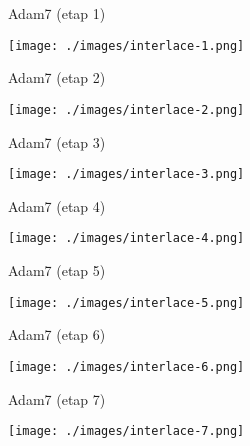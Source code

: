 \documentclass[presentation]{beamer}
\begin{document}
\begin{frame}[label={sec:orgb33b59d}]{Adam7 (etap 1)}
\begin{center}
\texttt{[image: ./images/interlace-1.png]}
\end{center}
\end{frame}

\begin{frame}[label={sec:org6484f97}]{Adam7 (etap 2)}
\begin{center}
\texttt{[image: ./images/interlace-2.png]}
\end{center}
\end{frame}

\begin{frame}[label={sec:org1b7b550}]{Adam7 (etap 3)}
\begin{center}
\texttt{[image: ./images/interlace-3.png]}
\end{center}
\end{frame}

\begin{frame}[label={sec:org499b941}]{Adam7 (etap 4)}
\begin{center}
\texttt{[image: ./images/interlace-4.png]}
\end{center}
\end{frame}

\begin{frame}[label={sec:orgdefcac7}]{Adam7 (etap 5)}
\begin{center}
\texttt{[image: ./images/interlace-5.png]}
\end{center}
\end{frame}

\begin{frame}[label={sec:org8eb476a}]{Adam7 (etap 6)}
\begin{center}
\texttt{[image: ./images/interlace-6.png]}
\end{center}
\end{frame}

\begin{frame}[label={sec:org8ae31eb}]{Adam7 (etap 7)}
\begin{center}
\texttt{[image: ./images/interlace-7.png]}
\end{center}
\end{frame}
\end{document}
